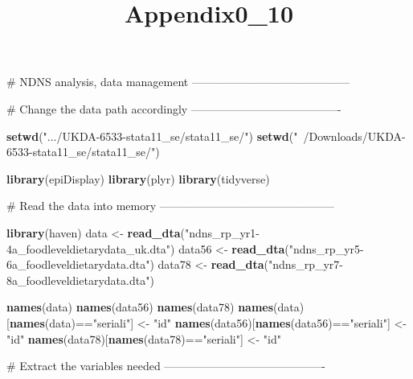\documentclass[]{article}
\title{Appendix0\_10}
\author{}
\date{}
\newenvironment{Shaded}{\begin{snugshade}}{\end{snugshade}}
\newcommand{\KeywordTok}[1]{\textcolor[rgb]{0.12,0.11,0.11}{\textbf{#1}}}
\newcommand{\StringTok}[1]{\textcolor[rgb]{0.75,0.01,0.01}{#1}}
\newcommand{\CommentTok}[1]{\textcolor[rgb]{0.54,0.53,0.53}{#1}}
\newcommand{\OperatorTok}[1]{\textcolor[rgb]{0.12,0.11,0.11}{#1}}
\newcommand{\NormalTok}[1]{\textcolor[rgb]{0.12,0.11,0.11}{#1}}
\begin{document}
\maketitle

\begin{Shaded}
\begin{Highlighting}[]
\CommentTok{# NDNS analysis, data management ------------------------------------------}


\CommentTok{# Change the data path accordingly ----------------------------------------}

\KeywordTok{setwd}\NormalTok{(}\StringTok{".../UKDA-6533-stata11_se/stata11_se/"}\NormalTok{) }
\KeywordTok{setwd}\NormalTok{(}\StringTok{"~/Downloads/UKDA-6533-stata11_se/stata11_se/"}\NormalTok{)}

\KeywordTok{library}\NormalTok{(epiDisplay)}
\KeywordTok{library}\NormalTok{(plyr)}
\KeywordTok{library}\NormalTok{(tidyverse)}


\CommentTok{# Read the data into memory -----------------------------------------------}

\KeywordTok{library}\NormalTok{(haven)}
\NormalTok{data <-}\StringTok{ }\KeywordTok{read_dta}\NormalTok{(}\StringTok{"ndns_rp_yr1-4a_foodleveldietarydata_uk.dta"}\NormalTok{)}
\NormalTok{data56 <-}\StringTok{ }\KeywordTok{read_dta}\NormalTok{(}\StringTok{"ndns_rp_yr5-6a_foodleveldietarydata.dta"}\NormalTok{)}
\NormalTok{data78 <-}\StringTok{ }\KeywordTok{read_dta}\NormalTok{(}\StringTok{"ndns_rp_yr7-8a_foodleveldietarydata.dta"}\NormalTok{)}

\KeywordTok{names}\NormalTok{(data)}
\KeywordTok{names}\NormalTok{(data56)}
\KeywordTok{names}\NormalTok{(data78)}
\KeywordTok{names}\NormalTok{(data)[}\KeywordTok{names}\NormalTok{(data)}\OperatorTok{==}\StringTok{"seriali"}\NormalTok{] <-}\StringTok{ "id"}
\KeywordTok{names}\NormalTok{(data56)[}\KeywordTok{names}\NormalTok{(data56)}\OperatorTok{==}\StringTok{"seriali"}\NormalTok{] <-}\StringTok{ "id"}
\KeywordTok{names}\NormalTok{(data78)[}\KeywordTok{names}\NormalTok{(data78)}\OperatorTok{==}\StringTok{"seriali"}\NormalTok{] <-}\StringTok{ "id"}


\CommentTok{# Extract the variables needed -------------------------------------------}


\end{Highlighting}
\end{Shaded}
\end{document}
